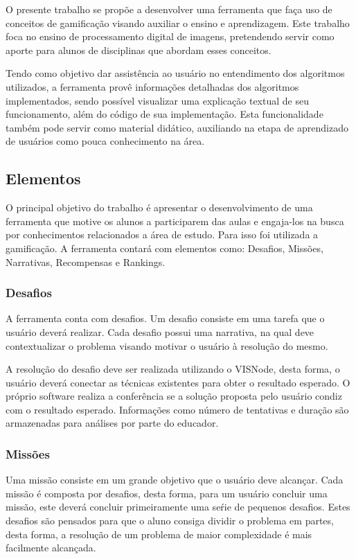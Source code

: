 \documentclass[
	12pt,				%
	oneside,			%
	a4paper,			%
	english,			%
	french,				%
	spanish,			%
	brazil,				%
	]{abntex2}
\begin{document}
O presente trabalho se propõe a desenvolver uma ferramenta que faça uso de conceitos de gamificação visando auxiliar o ensino e aprendizagem. Este trabalho foca no ensino de processamento digital de imagens, pretendendo servir como aporte para alunos de disciplinas que abordam esses conceitos.

Tendo como objetivo dar assistência ao usuário no entendimento dos algoritmos utilizados, a ferramenta provê informações detalhadas dos algoritmos implementados, sendo possível visualizar uma explicação textual de seu funcionamento, além do código de sua implementação. Esta funcionalidade também pode servir como material didático, auxiliando na etapa de aprendizado de usuários como pouca conhecimento na área.

\subsection{Elementos}

O principal objetivo do trabalho é apresentar o desenvolvimento de uma ferramenta que motive os alunos a participarem das aulas e engaja-los na busca por conhecimentos relacionados a área de estudo. Para isso foi utilizada a gamificação. A ferramenta contará com elementos como: Desafios, Missões, Narrativas, Recompensas e Rankings.

\subsubsection{Desafios}

A ferramenta conta com desafios. Um desafio consiste em uma tarefa que o usuário deverá realizar. Cada desafio possui uma narrativa, na qual deve contextualizar o problema visando motivar o usuário à resolução do mesmo.

A resolução do desafio deve ser realizada utilizando o VISNode, desta forma, o usuário deverá conectar as técnicas existentes para obter o resultado esperado. O próprio software realiza a conferência se a solução proposta pelo usuário condiz com o resultado esperado. Informações como número de tentativas e duração são armazenadas para análises por parte do educador.

\subsubsection{Missões}
\label{desafio:moedas}

Uma missão consiste em um grande objetivo que o usuário deve alcançar. Cada missão é composta por desafios, desta forma, para um usuário concluir uma missão, este deverá concluir primeiramente uma seŕie de pequenos desafios. Estes desafios são pensados para que o aluno consiga dividir o problema em partes, desta forma, a resolução de um problema de maior complexidade é mais facilmente alcançada.
\end{document}
